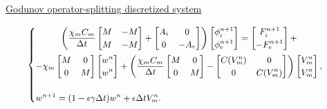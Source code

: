 \documentclass[8pt]{beamer}
\begin{document}
\begin{frame}
\begin{columns}
\begin{column}{0.5\textwidth}
            \end{column}
     \end{columns}
     \vspace{4mm}
\begin{center}
\underline{Godunov operator-splitting discretized system}
\end{center}
\begin{equation*}
\small
\begin{cases}
\begin{gathered}
\left(
\frac{\chi_m C_m}{\Delta t} \begin{bmatrix}M & -M \\ M & -M\end{bmatrix}
+ \begin{bmatrix} A_i & 0 \\ 0 & -A_e \end{bmatrix}
\right) \begin{bmatrix} \phi_i^{n+1} \\ \phi_e^{n+1}  \end{bmatrix} =
\begin{bmatrix} F_i^{n+1} \\ -F_e^{n+1} \end{bmatrix} + \\ -
\chi_m\begin{bmatrix} M & 0 \\ 0 & M \end{bmatrix} \begin{bmatrix} w^n \\ w^n \end{bmatrix} +
\left(\frac{\chi_mC_m}{\Delta t}\begin{bmatrix} M & 0 \\ 0 & M \end{bmatrix}
- \begin{bmatrix} C(V_m^n) & 0 \\ 0 & C(V_m^n)\end{bmatrix} 
\right) \begin{bmatrix} V_m^n \\ V_m^n \end {bmatrix},
\end{gathered} \\ \\
w^{n+1} = (1-\epsilon \gamma \Delta t) w^n + \epsilon \Delta tV_m^n.
\end{cases}
\end{equation*}

\end{frame}
\end{document}

